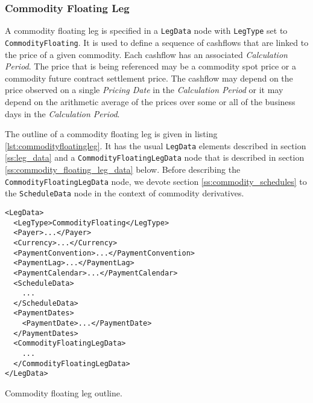 \subsubsection{Commodity Floating Leg}
\label{ss:commodityfloatingleg}

A commodity floating leg is specified in a \lstinline!LegData! node with \lstinline!LegType! set to \lstinline!CommodityFloating!. It is used to define a sequence of cashflows that are linked to the price of a given commodity. Each cashflow has an associated \textit{Calculation Period}. The price that is being referenced may be a commodity spot price or a commodity future contract settlement price. The cashflow may depend on the price observed on a single \textit{Pricing Date} in the \textit{Calculation Period} or it may depend on the arithmetic average of the prices over some or all of the business days in the \textit{Calculation Period}. 

The outline of a commodity floating leg is given in listing \ref{lst:commodityfloatingleg}. It has the usual \lstinline!LegData! elements described in section \ref{ss:leg_data} and a \lstinline!CommodityFloatingLegData! node that is described in section \ref{ss:commodity_floating_leg_data} below. Before describing the \lstinline!CommodityFloatingLegData! node, we devote section \ref{ss:commodity_schedules} to the \lstinline!ScheduleData! node in the context of commodity derivatives.

\begin{listing}[h!]
\begin{verbatim}
<LegData>
  <LegType>CommodityFloating</LegType>
  <Payer>...</Payer>
  <Currency>...</Currency>
  <PaymentConvention>...</PaymentConvention>
  <PaymentLag>...</PaymentLag>
  <PaymentCalendar>...</PaymentCalendar>
  <ScheduleData>
    ...
  </ScheduleData>
  <PaymentDates>
    <PaymentDate>...</PaymentDate>
  </PaymentDates>
  <CommodityFloatingLegData>
    ...
  </CommodityFloatingLegData>
</LegData>
\end{verbatim}
\caption{Commodity floating leg outline.}
\label{lst:commodityfloatingleg}
\end{listing}

